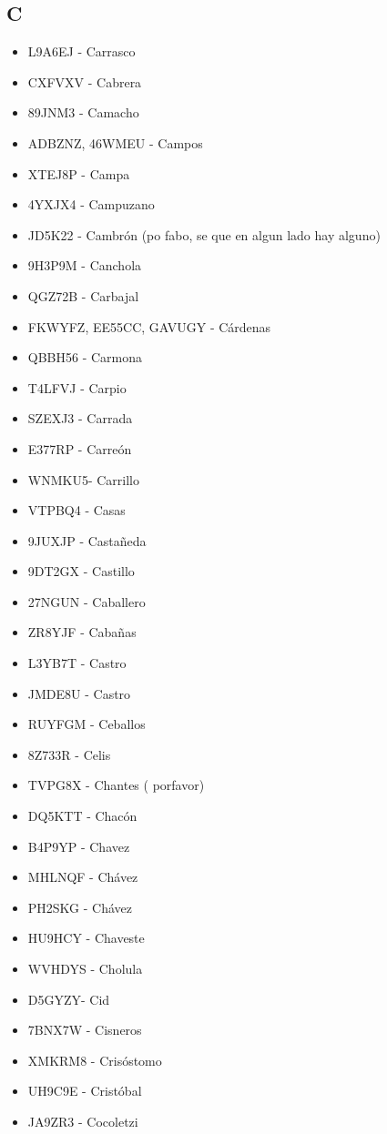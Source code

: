 \subsection*{C}
\begin{itemize}[leftmargin=*,nosep]
\item L9A6EJ - Carrasco
\item CXFVXV - Cabrera
\item 89JNM3 - Camacho
\item ADBZNZ, 46WMEU  -  Campos
\item XTEJ8P - Campa
\item 4YXJX4  -  Campuzano
\item JD5K22 - Cambrón (po fabo, se que en algun lado hay alguno)
\item 9H3P9M - Canchola
\item QGZ72B  -  Carbajal
\item FKWYFZ, EE55CC, GAVUGY - Cárdenas
\item QBBH56  -  Carmona
\item T4LFVJ  -  Carpio
\item SZEXJ3  -  Carrada
\item E377RP  -  Carreón
\item WNMKU5- Carrillo
\item VTPBQ4  -  Casas
\item 9JUXJP - Castañeda
\item 9DT2GX  - Castillo
\item 27NGUN - Caballero
\item ZR8YJF - Cabañas
\item L3YB7T  -  Castro
\item JMDE8U  -  Castro
\item RUYFGM - Ceballos
\item 8Z733R  -  Celis
\item TVPG8X - Chantes ( porfavor)
\item DQ5KTT - Chacón
\item B4P9YP  -  Chavez
\item MHLNQF - Chávez
\item PH2SKG  -  Chávez
\item HU9HCY - Chaveste
\item WVHDYS  -  Cholula
\item D5GYZY-  Cid
\item 7BNX7W  -  Cisneros
\item XMKRM8 - Crisóstomo
\item UH9C9E - Cristóbal
\item JA9ZR3 - Cocoletzi

\end{itemize}
